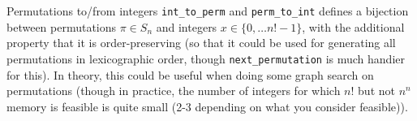 \begin{algorithm}{Permutations to/from integers}
\desc
{\tt int\_to\_perm} and {\tt perm\_to\_int} defines a bijection
between permutations $\pi \in S_n$ and integers $x \in \{0, \ldots
n!-1\}$, with the additional property that it is order-preserving (so
that it could be used for generating all permutations in lexicographic
order, though {\tt next\_permutation} is much handier for this).  In
theory, this could be useful when doing some graph search on
permutations (though in practice, the number of integers for which
$n!$ but not $n^n$ memory is feasible is quite small (2-3 depending on
what you consider feasible)).
\end{algorithm}


